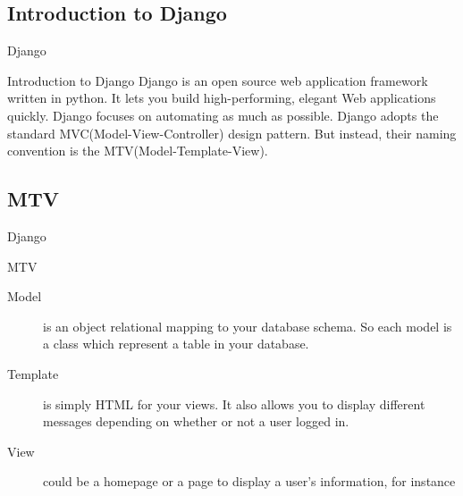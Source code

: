 \subsection{Introduction to Django}
\begin{frame}{Django}
\begin{block}{Introduction to Django}
\Django Django is an open source web application framework written in python. It lets you build high-performing, elegant Web applications quickly. Django focuses on automating as much as possible. Django adopts the standard MVC(Model-View-Controller) design pattern. But instead, their naming convention is the MTV(Model-Template-View).\\
\end{block}
\end{frame}
\newpage
\subsection{MTV}
\begin{frame}{Django}
\begin{block}{MTV}
\begin{description}
\item[Model] is an object relational mapping to your database schema. So each model is a class which represent a table in your database.
\item[Template] is simply HTML for your views. It also allows you to display different messages depending on whether or not a user logged in.
\item[View] could be a homepage or a page to display a user's information, for instance
\end{description}
\end{block}
\end{frame}



